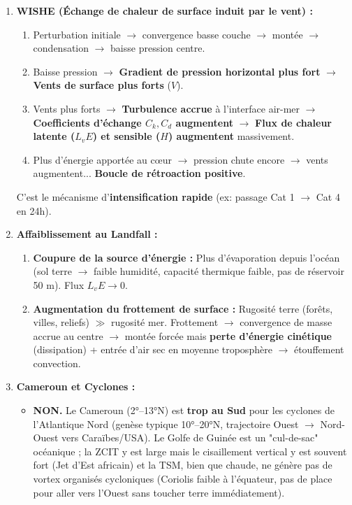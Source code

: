\documentclass[11pt]{article}
\begin{document}
\begin{exoresolu}
\begin{enumerate}
\begin{itemize}
              \item \textbf{Travail produit :} Énergie cinétique des vents ($V_{max}^2/2$). Rendement $\eta = (T_s - T_o)/T_s \approx 1/3$.
          \end{itemize}
    \item \textbf{WISHE (Échange de chaleur de surface induit par le vent) :}
          \begin{enumerate}
              \item Perturbation initiale $\rightarrow$ convergence basse couche $\rightarrow$ montée $\rightarrow$ condensation $\rightarrow$ baisse pression centre.
              \item Baisse pression $\rightarrow$ \textbf{Gradient de pression horizontal plus fort} $\rightarrow$ \textbf{Vents de surface plus forts} ($V$).
              \item Vents plus forts $\rightarrow$ \textbf{Turbulence accrue} à l'interface air-mer $\rightarrow$ \textbf{Coefficients d'échange $C_k, C_d$ augmentent} $\rightarrow$ \textbf{Flux de chaleur latente ($L_v E$) et sensible ($H$) augmentent} massivement.
              \item Plus d'énergie apportée au cœur $\rightarrow$ pression chute encore $\rightarrow$ vents augmentent... \textbf{Boucle de rétroaction positive}.
          \end{enumerate}
          C'est le mécanisme d'\textbf{intensification rapide} (ex: passage Cat 1 $\rightarrow$ Cat 4 en 24h).
    \item \textbf{Affaiblissement au Landfall :}
          \begin{enumerate}
              \item \textbf{Coupure de la source d'énergie :} Plus d'évaporation depuis l'océan (sol terre $\rightarrow$ faible humidité, capacité thermique faible, pas de réservoir 50 m). Flux $L_v E \rightarrow 0$.
              \item \textbf{Augmentation du frottement de surface :} Rugosité terre (forêts, villes, reliefs) $\gg$ rugosité mer. Frottement $\rightarrow$ convergence de masse accrue au centre $\rightarrow$ montée forcée mais \textbf{perte d'énergie cinétique} (dissipation) + entrée d'air sec en moyenne troposphère $\rightarrow$ étouffement convection.
          \end{enumerate}
    \item \textbf{Cameroun et Cyclones :}
          \begin{itemize}
              \item \textbf{NON.} Le Cameroun (2°--13°N) est \textbf{trop au Sud} pour les cyclones de l'Atlantique Nord (genèse typique 10°--20°N, trajectoire Ouest $\rightarrow$ Nord-Ouest vers Caraïbes/USA). Le Golfe de Guinée est un "cul-de-sac" océanique ; la ZCIT y est large mais le cisaillement vertical y est souvent fort (Jet d'Est africain) et la TSM, bien que chaude, ne génère pas de vortex organisés cycloniques (Coriolis faible à l'équateur, pas de place pour aller vers l'Ouest sans toucher terre immédiatement).

\end{itemize}
\end{enumerate}
\end{exoresolu}
\end{document}
